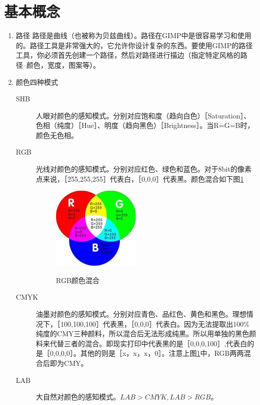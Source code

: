 \section{基本概念}
\begin{enumerate}
\item 路径\label{ll:lj}
路径是曲线（也被称为贝兹曲线）。路径在GIMP中是很容易学习和使用的。路径工具是非常强大的，它允许你设计复杂的东西。要使用GIMP的路径工具，你必须首先创建一个路径，然后对路径进行描边（指定特定风格的路径--颜色，宽度，图案等）。

\item 颜色四种模式\label{ll:ms}
\begin{description}
\item[SHB] 人眼对颜色的感知模式。分别对应饱和度（趋向白色）［Saturation］、色相（纯度）［Hue］、明度（趋向黑色）［Brightness］。当R=G=B时，颜色无色相。
\item[RGB] 光线对颜色的感知模式。分别对应红色、绿色和蓝色。对于8bit的像素点来说，［255,255,255］代表白，［0,0,0］代表黑。颜色混合如下图\ref{ll:ms:rgb}
\begin{figure}[!htbp]
	\centering
	\caption{RGB颜色混合} 
    	\includegraphics[scale=0.65]{figs/concept_RGB.jpg}
    	\label{ll:ms:rgb}
\end{figure}
\item[CMYK] 油墨对颜色的感知模式。分别对应青色、品红色、黄色和黑色。理想情况下，［100,100,100］代表黑，［0,0,0］代表白。因为无法提取出100\%纯度的CMY三种颜料，所以混合后无法形成纯黑。所以用单独的黑色颜料来代替三者的混合。即现实打印中代表黑的是［0,0,0,100］,代表白的是［0,0,0,0］。其他的则是［x，x，x，0］。注意上图\ref{ll:ms:rgb}中，RGB两两混合后即为CMY。
\item[LAB] 大自然对颜色的感知模式。$LAB>CMYK,LAB>RGB$。
\end{description}
\end{enumerate}





\clearpage